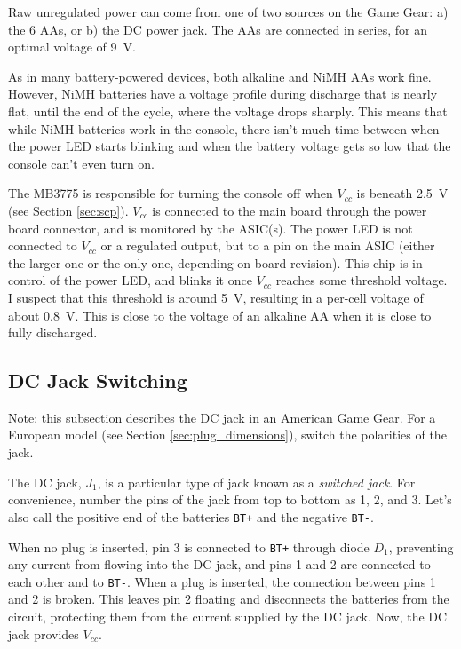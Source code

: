 \documentclass{article}
\newcommand{\Vcc}{$V_{cc}$}
\newcommand{\chippin}{\texttt}
\newcommand{\model}{\textsf}
\begin{document}
Raw unregulated power can come from one of two sources on the Game
Gear: a) the 6 AAs, or b) the DC power jack. The AAs are connected
in series, for an optimal voltage of \qty{9}{\volt}.

As in many battery-powered devices, both alkaline and NiMH AAs work
fine. However, NiMH batteries have a voltage profile during discharge
that is nearly flat, until the end of the cycle, where the voltage
drops sharply. This means that while NiMH batteries work in the
console, there isn't much time between when the power LED starts
blinking and when the battery voltage gets so low that the console
can't even turn on.

The \model{MB3775} is responsible for turning the console off when
\Vcc{} is beneath \qty{2.5}{\volt} (see Section \ref{sec:scp}). \Vcc{}
is connected to the main board through the power board connector, and
is monitored by the ASIC(s). The power LED is not connected to \Vcc{}
or a regulated output, but to a pin on the main ASIC (either the
larger one or the only one, depending on board revision). This chip is
in control of the power LED, and blinks it once \Vcc{} reaches some
threshold voltage. I suspect that this threshold is around
\qty{5}{\volt}, resulting in a per-cell voltage of about
\qty{0.8}{\volt}. This is close to the voltage of an alkaline AA when
it is close to fully discharged.

\subsection{DC Jack Switching}
\label{sec:jack_switching}
Note: this subsection describes the DC jack in an American Game
Gear. For a European model (see Section \ref{sec:plug_dimensions}),
switch the polarities of the jack.

The DC jack, $J_1$, is a particular type of jack known as a
\textit{switched jack}. For convenience, number the pins of the jack
from top to bottom as 1, 2, and 3. Let's also call the positive end of
the batteries \chippin{BT+} and the negative \chippin{BT-}.

When no plug is inserted, pin 3 is connected to \chippin{BT+} through
diode $D_1$, preventing any current from flowing into the DC jack, and
pins 1 and 2 are connected to each other and to \chippin{BT-}. When a
plug is inserted, the connection between pins 1 and 2 is broken. This
leaves pin 2 floating and disconnects the batteries from the circuit,
protecting them from the current supplied by the DC jack. Now, the DC
jack provides \Vcc{}.
\end{document}
